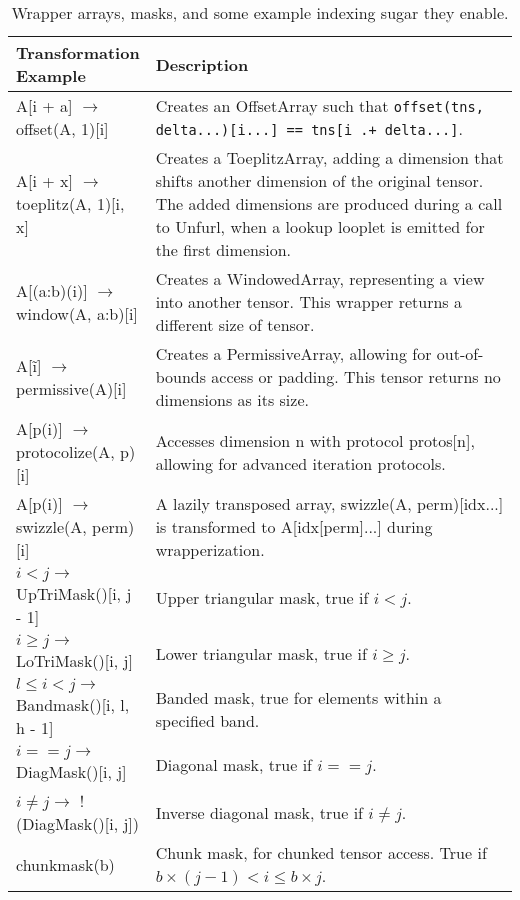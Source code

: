     \begin{table}[h]
        \scriptsize
        \centering
        \begin{tabular}{|>{\raggedright\arraybackslash}m{0.25\linewidth}|>{\raggedright\arraybackslash}m{0.75\linewidth}|}
        \hline
        \textbf{Transformation Example} & \textbf{Description} \\
        \hline
        A[i + a] $\rightarrow$ offset(A, 1)[i] & Creates an OffsetArray such that \texttt{offset(tns, delta...)[i...] == tns[i .+ delta...]}. \\
        \hline
        A[i + x] $\rightarrow$ toeplitz(A, 1)[i, x] & Creates a ToeplitzArray, adding a dimension that shifts another dimension of the original tensor. The added dimensions are produced during a call to Unfurl, when a lookup looplet is emitted for the first dimension. \\
        \hline
        A[(a:b)(i)] $\rightarrow$ window(A, a:b)[i] & Creates a WindowedArray, representing a view into another tensor. This wrapper returns a different size of tensor. \\
        \hline
        A[\~i] $\rightarrow$ permissive(A)[i] & Creates a PermissiveArray, allowing for out-of-bounds access or padding. This tensor returns no dimensions as its size. \\
        \hline
        A[p(i)] $\rightarrow$ protocolize(A, p)[i] & Accesses dimension n with protocol protos[n], allowing for advanced iteration protocols. \\
        \hline
        A[p(i)] $\rightarrow$ swizzle(A, perm)[i] & A lazily transposed array, swizzle(A, perm)[idx...] is transformed to A[idx[perm]...] during wrapperization. \\
        \hline
        $i < j \rightarrow$ UpTriMask()[i, j - 1] & Upper triangular mask, true if $i < j$. \\
        \hline
        $i \geq j \rightarrow$ LoTriMask()[i, j] & Lower triangular mask, true if $i \geq j$. \\
        \hline
        $l \leq i < j \rightarrow$ Bandmask()[i, l, h - 1] & Banded mask, true for elements within a specified band. \\
        \hline
        $i == j \rightarrow$ DiagMask()[i, j] & Diagonal mask, true if $i == j$. \\
        \hline
        $i \neq j \rightarrow$ !(DiagMask()[i, j]) & Inverse diagonal mask, true if $i \neq j$. \\
        \hline
        chunkmask(b) & Chunk mask, for chunked tensor access. True if $b \times (j - 1) < i \leq b \times j$. \\
        \hline
        \end{tabular}
        \caption{Wrapper arrays, masks, and some example indexing sugar they enable.}
    \label{tab:wrappers}
    \end{table}

